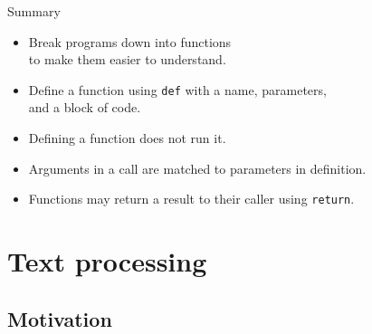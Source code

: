 \documentclass[aspectratio=169,usenames,dvipsnames]{beamer}
\begin{document}
\begin{frame}{Summary}
    \begin{itemize}
        \item Break programs down into functions \\
            to make them easier to understand.
        \item Define a function using \texttt{def} with a name, parameters,\\
            and a block of code.
        \item Defining a function does not run it.
        \item Arguments in a call are matched to parameters in definition.
        \item Functions may return a result to their caller using \texttt{return}.
    \end{itemize}
\end{frame}





\section{Text processing}
\subsection{Motivation}
\frame{\tableofcontents[currentsection]}

\end{document}
